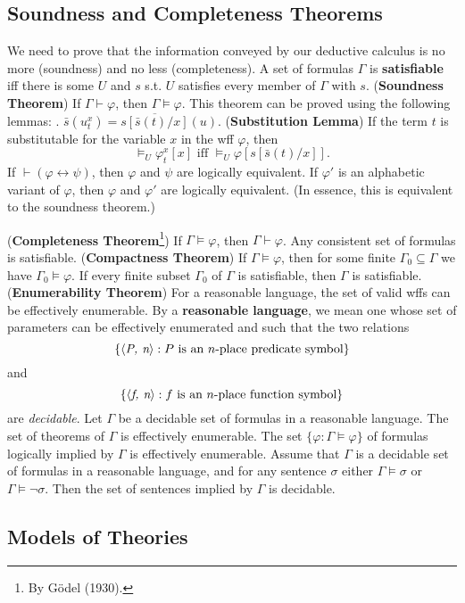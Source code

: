 \documentclass{myproc}
\begin{document}
\subsection{Soundness and Completeness Theorems}
\bit
\w We need to prove that the information conveyed by
	our deductive calculus is no more (soundness) and no less
	(completeness).
\w A set of formulas $\Gamma$ is {\bf{}satisfiable} iff there is
	some $U$ and $s$ s.t. $U$ satisfies every member of $\Gamma$
	with $s$.
\w ({\bf{}Soundness Theorem}) If $\Gamma \vdash \varphi$,
	then $\Gamma \models \varphi$.
	\bit
	\w This theorem can be proved using the following lemmas:
		\ben
		.
		\w $\bar{s}(u^x_t) = \overline{s[\bar{s}(t)/x]}(u)$.
		\w ({\bf{}Substitution Lemma})
			If the term $t$ is substitutable for the 
			variable $x$ in
			the wff $\varphi$, then
				\[ \models_U \varphi^x_t[x] \mbox{\ iff\ }
				\models_U \varphi[s[\bar{s}(t)/x]].
				\]
		\w If $\vdash (\varphi \leftrightarrow \psi)$, then
			$\varphi$ and $\psi$ are logically equivalent.
		\w If $\varphi'$ is an alphabetic variant of $\varphi$,
			then $\varphi$ and $\varphi'$ are logically equivalent.
		 (In essence, this is
			equivalent to the soundness theorem.)
			
		\een
	\eit
\w ({\bf{}Completeness Theorem}\footnote{By G\"{o}del (1930).})
	\ben
	\w [(a)] If $\Gamma \models \varphi$, then $\Gamma \vdash \varphi$.
	\w [(b)] Any consistent set of formulas is satisfiable.
	\een
\w ({\bf{}Compactness Theorem})
	\ben
	\w [(a)] If $\Gamma \models \varphi$, then for some finite
		$\Gamma_0 \subseteq \Gamma$ we have
		$\Gamma_0 \models \varphi$.
	\w [(b)] If every finite subset $\Gamma_0$ of $\Gamma$ is satisfiable,
		then $\Gamma$ is satisfiable.
	\een
\w ({\bf{}Enumerability Theorem})
	For a reasonable language, the set of valid wffs can be 
	effectively enumerable.
	\bit
	\w By a {\bf{}reasonable language}, we mean one whose set of 
		parameters can be effectively enumerated and such that
		the two relations
		\[ \{\mbox{$\langle{\textit{P, n}}\rangle$}: \mbox{$P$ is an $n$-place predicate symbol}\} \]
		and
		\[ \{\mbox{$\langle{\textit{f, n}}\rangle$}: \mbox{$f$ is an $n$-place function symbol}\} \]
		are {\em{}decidable\/}.
	\eit
\w Let $\Gamma$ be a decidable set of formulas in a reasonable language.
	\ben
	\w [(a)] The set of theorems of $\Gamma$ is effectively enumerable.
	\w [(b)] The set $\{\varphi: \Gamma \models \varphi\}$ of 
		formulas logically implied by $\Gamma$ is effectively
		enumerable.
	\een
\w Assume that $\Gamma$ is a decidable set of formulas in a 
	reasonable language, and for any sentence $\sigma$ either
	$\Gamma \models \sigma$ or $\Gamma \models \neg\sigma$.
	Then the set of sentences implied by $\Gamma$ is
	decidable.

\eit

\subsection{Models of Theories}



\nocite{Enderton72,Barwise77,BM96}
\end{document}
